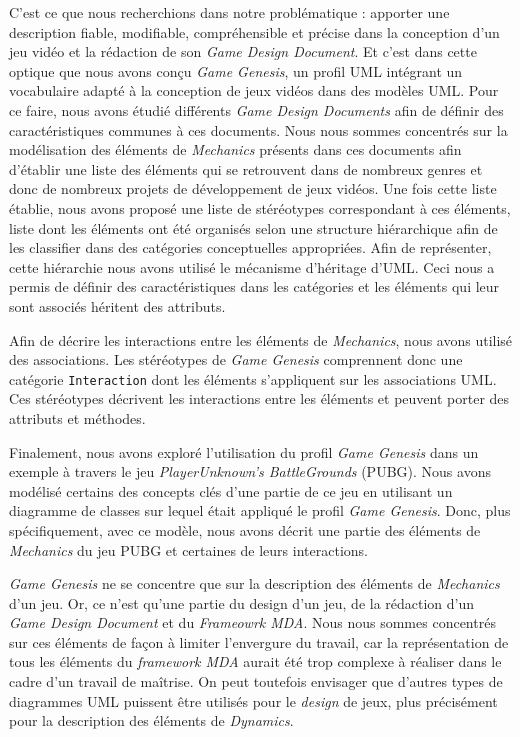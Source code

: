 \begin{conclusion}



C'est ce que nous recherchions dans notre problématique : apporter une description fiable, modifiable, compréhensible et précise dans la conception d'un jeu vidéo et la rédaction de son \emph{Game Design Document}.
%
Et c'est dans cette optique que nous avons conçu \emph{Game Genesis}, un profil UML intégrant un vocabulaire adapté à la conception de jeux vidéos dans des modèles UML.
%
Pour ce faire, 
nous avons étudié différents \emph{Game Design Documents} afin de définir des caractéristiques communes à ces documents.
Nous nous sommes concentrés sur la modélisation des éléments de \emph{Mechanics} présents dans ces documents afin d'établir une liste des éléments qui se retrouvent dans de nombreux genres et donc de nombreux projets de développement de jeux vidéos.
Une fois cette liste établie, nous avons proposé une liste de stéréotypes correspondant à ces éléments, 
liste dont les éléments ont été organisés selon une structure hiérarchique afin de les classifier dans des catégories conceptuelles appropriées.
Afin de représenter, cette hiérarchie nous avons utilisé le mécanisme d'héritage d'UML.
Ceci nous a permis de définir des caractéristiques dans les catégories et les éléments qui leur sont associés héritent des attributs.

Afin de décrire les interactions entre les éléments de \emph{Mechanics}, nous avons utilisé des associations.
Les stéréotypes de \emph{Game Genesis} comprennent donc une catégorie \texttt{Interaction} dont les éléments s'appliquent sur les associations UML.
Ces stéréotypes décrivent les interactions entre les éléments et peuvent porter des attributs et méthodes.

Finalement, nous avons exploré l'utilisation du profil \emph{Game Genesis} dans un exemple à travers le jeu \emph{PlayerUnknown's BattleGrounds} (PUBG).
Nous avons modélisé certains des concepts clés d'une partie de ce jeu en utilisant un diagramme de classes sur lequel était appliqué le profil \emph{Game Genesis}.
Donc, plus spécifiquement, avec ce modèle, nous avons décrit une partie des éléments de \emph{Mechanics} du jeu PUBG et certaines de leurs interactions.

\emph{Game Genesis} ne se concentre que sur la description des éléments de \emph{Mechanics} d'un jeu.
Or, ce n'est qu'une partie du design d'un jeu, de la rédaction d'un \emph{Game Design Document} et du \emph{Frameowrk MDA}.
Nous nous sommes concentrés sur ces éléments de façon à limiter l'envergure du travail, car la représentation de tous les éléments du \emph{framework MDA} aurait été trop complexe à réaliser dans le cadre d'un travail de maîtrise.
%
On peut toutefois envisager que d'autres types de diagrammes UML
puissent être utilisés pour le \emph{design} de jeux, plus précisément
pour la description des éléments de \emph{Dynamics}.


\end{conclusion}
